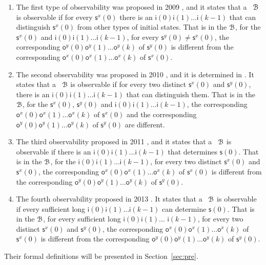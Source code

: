 \begin{enumerate}
	\item The first type of observability was proposed in 2009 \cite{cheng2009controllability}, and it states that a \BCN\ ${\mathcal{B}}$ is observable if for every $\mathsf{s}^{x}(0)$ there is an $\mathsf{i}(0)\mathsf{i}(1)\ldots\mathsf{i}(k-1)$ that can distinguish $\mathsf{s}^{x}(0)$ from other types of initial states. That is in the ${\mathcal{B}}$, for the $\mathsf{s}^{x}(0)$ and $\mathsf{i}(0)$$\mathsf{i}(1)\ldots$$\mathsf{i}(k-1)$, for every $\mathsf{s}^{y}(0)\ne\mathsf{s}^{x}(0)$, the corresponding $\mathsf{o}^{y}(0)$$\mathsf{o}^{y}(1)\ldots$$\mathsf{o}^{y}(k)$ of $\mathsf{s}^{y}(0)$ is different from the corresponding $\mathsf{o}^{x}(0)$$\mathsf{o}^{x}(1)\ldots$$\mathsf{o}^{x}(k)$ of $\mathsf{s}^{x}(0)$. 
	\item 
	The second observability was proposed in 2010 \cite{Zhao2010Input}, and it is determined in \cite{Li2015Controllability}. It states that a \BCN\ ${\mathcal{B}}$ is observable if for every two distinct $\mathsf{s}^{x}(0)$ and $\mathsf{s}^{y}(0)$, there is an $\mathsf{i}(0)$$\mathsf{i}(1)\ldots$$\mathsf{i}(k-1)$ that can distinguish them. That is in the ${\mathcal{B}}$, for the $\mathsf{s}^{x}(0)$, $\mathsf{s}^{y}(0)$ and $\mathsf{i}(0)\mathsf{i}(1)\ldots\mathsf{i}(k-1)$, the corresponding $\mathsf{o}^{x}(0)\mathsf{o}^{x}(1)\ldots\mathsf{o}^{x}(k)$ of $\mathsf{s}^{x}(0)$ and the corresponding $\mathsf{o}^{y}(0)\mathsf{o}^{y}(1)\ldots\mathsf{o}^{y}(k)$ of $\mathsf{s}^{y}(0)$ are different.
	\item The third observability proposed in 2011 \cite{Cheng2011Identification}, and it states that a \BCN\ ${\mathcal{B}}$ is observable if there is an $\mathsf{i}(0)$$\mathsf{i}(1)\ldots$$\mathsf{i}(k-1)$ that determines $\mathsf{s}(0)$. That is in the ${\mathcal{B}}$, for the $\mathsf{i}(0)$$\mathsf{i}(1)\ldots$$\mathsf{i}(k-1)$, for every two distinct $\mathsf{s}^{x}(0)$ and $\mathsf{s}^{x}(0)$, the corresponding $\mathsf{o}^{x}(0)$$\mathsf{o}^{x}(1)\ldots$$\mathsf{o}^{x}(k)$ of $\mathsf{s}^{x}(0)$ is different from the corresponding $\mathsf{o}^{y}(0)$$\mathsf{o}^{y}(1)\ldots$$\mathsf{o}^{y}(k)$ of $\mathsf{s}^{y}(0)$.
	
	\item  The fourth observability proposed in 2013 \cite{Fornasini2013Observability}. It states that a \BCN\ ${\mathcal{B}}$ is observable if every sufficient long $\mathsf{i}(0)$$\mathsf{i}(1)\ldots$$\mathsf{i}(k-1)$ can determine $\mathsf{s}(0)$. That is in the ${\mathcal{B}}$, for every sufficient long $\mathsf{i}(0)$$\mathsf{i}(1)\ldots$ $\mathsf{i}(k-1)$, for every two distinct $\mathsf{s}^{x}(0)$ and $\mathsf{s}^{y}(0)$, the corresponding $\mathsf{o}^{x}(0)$$\mathsf{o}^{x}(1)\ldots$$\mathsf{o}^{x}(k)$ of $\mathsf{s}^{x}(0)$ is different from the corresponding $\mathsf{o}^{y}(0)$$\mathsf{o}^{y}(1)\ldots$$\mathsf{o}^{y}(k)$ of $\mathsf{s}^{y}(0)$.
\end{enumerate}
 Their formal definitions will be presented in Section~\ref{sec:pre}.

